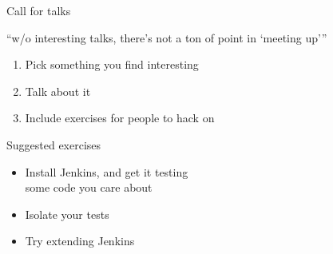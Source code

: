 \documentclass[xcolor=svgnames,17pt]{beamer}
\begin{document}
\begin{frame}
\end{frame}

\begin{frame}{Call for talks}

“w/o interesting talks, there's not a ton of point in ‘meeting up’”

\pause

\begin{enumerate}
\item Pick something you find interesting
\item Talk about it
\item Include exercises for people to hack on
\end{enumerate}

\end{frame}

\begin{frame}{Suggested exercises}
\begin{itemize}
\item Install Jenkins, and get it testing \\ some code you care about
\item Isolate your tests
\item Try extending Jenkins
\end{itemize}
\end{frame}
\end{document}
